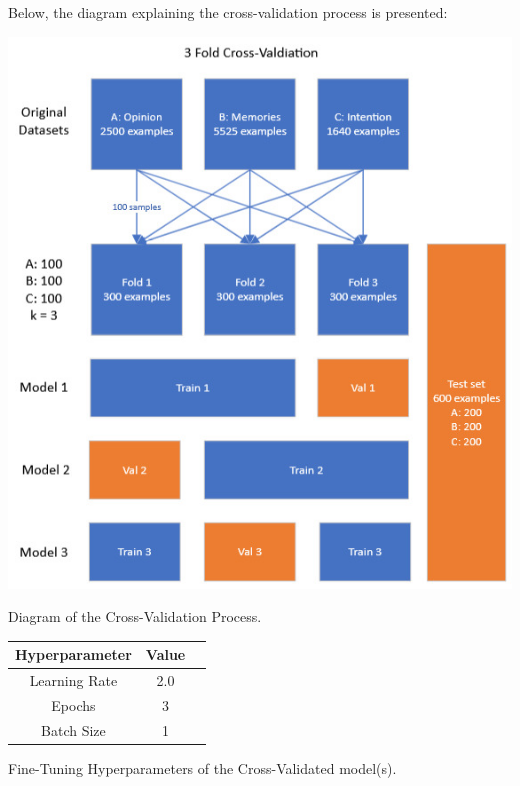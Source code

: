 \documentclass[10pt,twocolumn,letterpaper]{article}
\begin{document}
Below, the diagram explaining the cross-validation process is presented:

\begin{center}
\includegraphics*[scale=0.40]{img/cross_validation_diagram.jpg}
\end{center}

\begin{center}
    \small {Diagram of the Cross-Validation Process.} 
\end{center}

\begin{center}

    \begin{tabular}{ccc}
        \toprule
        Hyperparameter & Value \\
        \midrule
        Learning Rate & 2.0 \\
        Epochs & 3 \\
        Batch Size & 1 \\
        \bottomrule
    \end{tabular} 
 
\end{center}

\begin{center}
    \small {Fine-Tuning Hyperparameters of the Cross-Validated model(s).}
\end{center}
\end{document}
